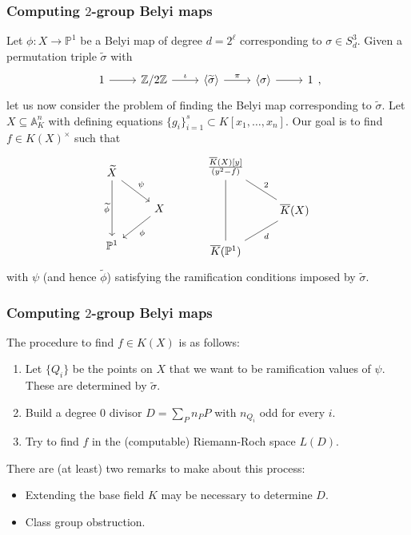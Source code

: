 \documentclass[handout, xcolor=dvipsnames]{beamer}
\theoremstyle{plain}
\newcommand{\A}{\mathbb A}
\newcommand{\PP}{\mathbb P}
\newcommand{\Z}{\mathbb{Z}}
\newcommand{\wt}[1]{\widetilde{#1}}
\begin{document}
  \begin{frame}[plain]
    \frametitle{Computing $2$-group Belyi maps}
    Let $\phi:X\to\PP^1$ be a Belyi map
    of degree $d = 2^\ell$
    corresponding
    \newline
    to $\sigma\in S_d^3$.
    \pause
    Given a permutation triple $\wt{\sigma}$ with
    \[
      \begin{tikzcd}[ampersand replacement=\&, row sep = small]
        1\arrow{r}\&\Z/2\Z\arrow{r}{\iota}\&\langle\widetilde{\sigma}\rangle\arrow{r}{\pi}\&\langle\sigma\rangle\arrow{r}\&1
      \end{tikzcd},
    \]
    let us now consider the problem of finding the Belyi map
    corresponding to $\wt{\sigma}$.
    \pause
    Let $X\subseteq\A_K^n$ with defining equations
    $\{g_i\}_{i=1}^s\subset K[x_1,\dots,x_n]$.
    \pause
    Our goal is to find $f\in K(X)^\times$ such that
    \[
      \begin{tikzcd}[ampersand replacement=\&]
        \widetilde{X}\arrow{dd}[swap]{\widetilde{\phi}}\arrow{dr}{\psi}\\
        \&X\arrow{dl}{\phi}\\
        \PP^1
      \end{tikzcd}
      \quad
      \quad
      \quad
      \begin{tikzcd}[ampersand replacement=\&]
        \frac{\overline{K}(X)[y]}{(y^2-f)}\arrow[dash]{dd}\arrow[dash]{dr}{2}\\
        \&\overline{K}(X)\arrow[dash]{dl}{d}\\
        \overline{K}(\PP^1)
      \end{tikzcd}
    \]
    with $\psi$ (and hence $\wt{\phi}$) satisfying the ramification conditions imposed by
    $\wt{\sigma}$.
  \end{frame}
  \begin{frame}[plain]
    \frametitle{Computing $2$-group Belyi maps}
    The procedure to find $f\in K(X)$ is as follows:
    \begin{enumerate}
      \pause
      \item
        Let $\{Q_i\}$ be the points on $X$ that we want to
        be ramification values of $\psi$.
        These are determined by $\wt{\sigma}$.
      \item
        Build a degree $0$ divisor $D = \sum_{P} n_P P$
        with $n_{Q_i}$ odd for every $i$.
      \item
        Try to find $f$ in the (computable) Riemann-Roch space $L(D)$.
    \end{enumerate}
    \pause
    There are (at least) two remarks to make about this process:
    \begin{itemize}
      \item
        Extending the base field $K$ may be necessary
        to determine $D$.
      \item
        Class group obstruction.
    \end{itemize}
  \end{frame}
\end{document}

